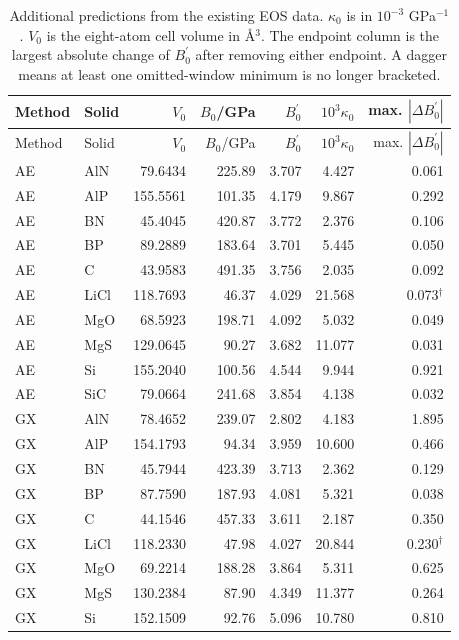 {\small
\begin{longtable}{llrrrrr}
\caption{Additional predictions from the existing EOS data. $\kappa_0$ is in $10^{-3}$ GPa$^{-1}$. $V_0$ is the eight-atom cell volume in \AA$^3$. The endpoint column is the largest absolute change of $B_0^\prime$ after removing either endpoint. A dagger means at least one omitted-window minimum is no longer bracketed.}\label{tab:eos-extra}\\
\toprule
Method & Solid & $V_0$ & $B_0$/GPa & $B_0^\prime$ & $10^3\kappa_0$ & max. $|\Delta B_0^\prime|$\\
\midrule
\endfirsthead
\toprule
Method & Solid & $V_0$ & $B_0$/GPa & $B_0^\prime$ & $10^3\kappa_0$ & max. $|\Delta B_0^\prime|$\\
\midrule
\endhead
AE & AlN & 79.6434 & 225.89 & 3.707 & 4.427 & 0.061 \\
AE & AlP & 155.5561 & 101.35 & 4.179 & 9.867 & 0.292 \\
AE & BN & 45.4045 & 420.87 & 3.772 & 2.376 & 0.106 \\
AE & BP & 89.2889 & 183.64 & 3.701 & 5.445 & 0.050 \\
AE & C & 43.9583 & 491.35 & 3.756 & 2.035 & 0.092 \\
AE & LiCl & 118.7693 & 46.37 & 4.029 & 21.568 & 0.073$^\dagger$ \\
AE & MgO & 68.5923 & 198.71 & 4.092 & 5.032 & 0.049 \\
AE & MgS & 129.0645 & 90.27 & 3.682 & 11.077 & 0.031 \\
AE & Si & 155.2040 & 100.56 & 4.544 & 9.944 & 0.921 \\
AE & SiC & 79.0664 & 241.68 & 3.854 & 4.138 & 0.032 \\
GX & AlN & 78.4652 & 239.07 & 2.802 & 4.183 & 1.895 \\
GX & AlP & 154.1793 & 94.34 & 3.959 & 10.600 & 0.466 \\
GX & BN & 45.7944 & 423.39 & 3.713 & 2.362 & 0.129 \\
GX & BP & 87.7590 & 187.93 & 4.081 & 5.321 & 0.038 \\
GX & C & 44.1546 & 457.33 & 3.611 & 2.187 & 0.350 \\
GX & LiCl & 118.2330 & 47.98 & 4.027 & 20.844 & 0.230$^\dagger$ \\
GX & MgO & 69.2214 & 188.28 & 3.864 & 5.311 & 0.625 \\
GX & MgS & 130.2384 & 87.90 & 4.349 & 11.377 & 0.264 \\
GX & Si & 152.1509 & 92.76 & 5.096 & 10.780 & 0.810 \\

\end{longtable}}
